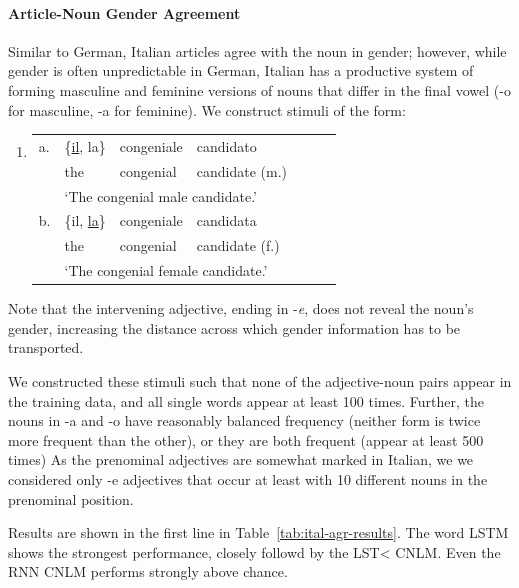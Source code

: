 \paragraph{Article-Noun Gender Agreement}

Similar to German, Italian articles agree with the noun in gender; however, while gender is often unpredictable in German, Italian has a productive system of forming masculine and feminine versions of nouns that differ in the final vowel (-o for masculine, -a for feminine).
We construct stimuli of the form:
\begin{enumerate}[label={(\arabic*)}]
	\item 
		\begin{tabular}[t]{lllllll}
	a. & \{\underline{il}, la\} & congeniale & candidato \\
   &  the & congenial & candidate (m.) \\
	& \multicolumn{4}{l}{`The congenial male candidate.'} \\
	b. & \{il, \underline{la}\} & congeniale & candidata \\
    &the & congenial & candidate (f.) \\
	& \multicolumn{4}{l}{`The congenial female candidate.'} \\
\end{tabular}
\end{enumerate}

Note that the intervening adjective, ending in -\emph{e}, does not reveal the noun's gender, increasing the distance across which gender information has to be transported.

We constructed these stimuli such that none of the adjective-noun pairs appear in the training data, and all single words appear at least 100 times.
Further, the nouns in -a and  -o have reasonably balanced frequency (neither form is twice more frequent than the other), or they are both frequent (appear at least 500 times)
As the prenominal adjectives are somewhat marked in Italian, we  we considered only -e adjectives that occur at least with 10 different nouns in the prenominal position.

Results are shown in the first line in Table~\ref{tab:ital-agr-results}.
The word LSTM shows the strongest performance, closely followd by the LST< CNLM.
Even the RNN CNLM performs strongly above chance.

